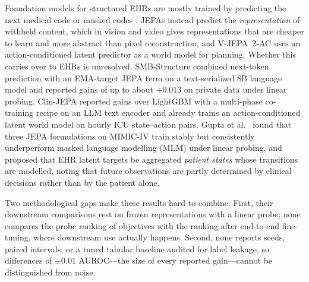 \documentclass[10pt,letterpaper]{article}
\begin{document}
Foundation models for structured EHRs are mostly trained by predicting the
next medical code \citep{clmbr,ethos,cehrgpt,delphi2m,motor} or masked codes
\citep{behrt,medbert}. JEPAs \citep{ijepa,vjepa2,lejepa} instead predict the
\emph{representation} of withheld content, which in vision and video gives
representations that are cheaper to learn and more abstract than pixel
reconstruction, and V-JEPA~2-AC \citep{vjepa2} uses an action-conditioned
latent predictor as a world model for planning. Whether this carries over to
EHRs is unresolved. SMB-Structure \citep{smbstructure} combined next-token
prediction with an EMA-target JEPA term on a text-serialized 8B language model
and reported gains of up to about $+0.013$ on private data under linear
probing. Clin-JEPA \citep{clinjepa} reported gains over LightGBM with a
multi-phase co-training recipe on an LLM text encoder and already trains an
action-conditioned latent world model on hourly ICU state--action pairs. Gupta et
al.\ \citep{imperialjepa} found that three JEPA formulations on MIMIC-IV train
stably but consistently underperform masked language modelling (MLM) under
linear probing, and proposed that EHR latent targets be aggregated
\emph{patient states} whose transitions are modelled, noting that future
observations are partly determined by clinical decisions rather than by the
patient alone.

Two methodological gaps make these results hard to combine. First, their downstream comparisons rest on frozen
representations with a linear probe; none compares the probe ranking of objectives with
the ranking after end-to-end fine-tuning, where downstream use actually happens. Second, none reports
seeds, paired intervals, or a tuned tabular baseline audited for label
leakage, so differences of $\pm 0.01$ AUROC---the size of every reported gain---cannot be
distinguished from noise.
\end{document}
